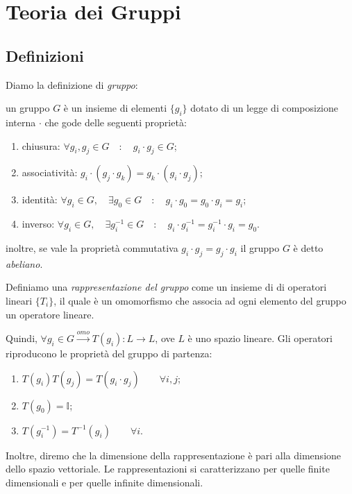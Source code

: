 \section{Teoria dei Gruppi}
\subsection{Definizioni}

Diamo la definizione di \textit{gruppo}:

un gruppo $G$ è un insieme di elementi $\{g_i\}$ dotato di un legge di composizione interna $\cdot$ che gode delle seguenti proprietà:
\begin{enumerate}
    \item chiusura: $\forall g_i,g_j\in G \quad:\quad g_i\cdot g_j\in G$;
    \item associatività: $g_i\cdot (g_j\cdot g_k)=g_k\cdot (g_i\cdot g_j)$;
    \item identità: $\forall g_i\in G, \quad\exists g_0\in G \quad : \quad  g_i\cdot g_0= g_0\cdot g_i=g_i $;
    \item inverso: $\forall g_i\in G, \quad\exists g_i^{-1}\in G \quad : \quad  g_i\cdot g_i^{-1}= g_i^{-1}\cdot g_i=g_0$.
\end{enumerate}
inoltre, se vale la proprietà commutativa $g_i\cdot g_j=g_j\cdot g_i$ il gruppo $G$ è detto \textit{abeliano}.

Definiamo una \textit{rappresentazione del gruppo} come un insieme di di operatori lineari $\{T_i\}$, il quale è un omomorfismo che associa ad ogni elemento del gruppo un operatore lineare.

Quindi, $\forall g_i\in G\xrightarrow{omo}T(g_i):L\xrightarrow{}L$, ove $L$ è uno spazio lineare. Gli operatori riproducono le proprietà del gruppo di partenza:
\begin{enumerate}
    \item  $T(g_i)T(g_j)=T(g_i\cdot g_j)\qquad\forall i,j$;
    \item $T(g_0)=\mathds{I}$;
    \item  $T(g_i^{-1})=T^{-1}(g_i) \qquad\forall i$.
\end{enumerate}
Inoltre, diremo che la dimensione della rappresentazione è pari alla dimensione dello spazio vettoriale. Le rappresentazioni si caratterizzano per quelle finite dimensionali e per quelle infinite dimensionali.

